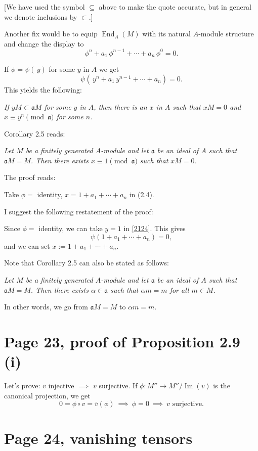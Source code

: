 \documentclass[12pt]{article}
\newcommand{\oo}{\operatorname}
\newcommand{\mf}{\mathfrak}
\begin{document}
[We have used the symbol $\subseteq$ above to make the quote accurate, but in general we denote inclusions by $\subset$.]

Another fix would be to equip $\operatorname{End}_A(M)$ with its natural $A$-module structure and change the display to 
$$
\phi^n+a_1\,\phi^{n-1}+\cdots+a_n\,\phi^0=0.
$$

If $\phi=\psi(\,y)$ for some $y$ in $A$ we get 
\begin{equation}\label{2124}
\psi(\,y^n+a_1\,y^{n-1}+\cdots+a_n)=0.
\end{equation}
This yields the following:

\emph{If $yM\subset\mf aM$ for some $y$ in $A$, then there is an $x$ in $A$ such that $xM=0$ and $x\equiv y^n\pmod{\mf a}$ for some $n$.}

Corollary 2.5 reads:

\emph{Let $M$ be a finitely generated $A$-module and let $\mf a$ be an ideal of $A$ such that $\mf aM=M$. Then there exists $x\equiv1\pmod{\mf a}$ such that $xM=0$.}

The proof reads:

Take $\phi=$ identity, $x=1+a_1+\cdots+a_n$ in (2.4).

I suggest the following restatement of the proof:

Since $\phi=$ identity, we can take $y=1$ in \eqref{2124}. This gives 
$$
\psi(1+a_1+\cdots+a_n)=0,
$$ 
and we can set $x:=1+a_1+\cdots+a_n$.

Note that Corollary 2.5 can also be stated as follows:

\emph{Let $M$ be a finitely generated $A$-module and let $\mf a$ be an ideal of $A$ such that $\mf aM=M$. Then there exists $\alpha\in\mf a$ such that $\alpha m=m$ for all $m\in M$.}

In other words, we go from $\mf aM=M$ to $\alpha m=m$.

\section{Page 23, proof of Proposition 2.9 (i)}%

Let's prove: $\overline v$ injective $\implies$ $v$ surjective. If $\phi:M''\to M''/\oo{Im}(v)$ is the canonical projection, we get 
$$
0=\phi\circ v=\overline v(\phi)\ \implies\ \phi=0\ \implies\ v\text{ surjective.}
$$

\section{Page 24, vanishing tensors}\label{vt}%
\end{document}
